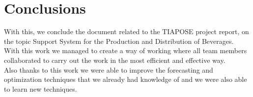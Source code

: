 \newpage

\section{Conclusions}

\quad With this, we conclude the document related to the TIAPOSE project report, on the topic Support System for the Production and Distribution of Beverages.\\

With this work we managed to create a way of working where all team members collaborated to carry out the work in the most efficient and effective way.\\

Also thanks to this work we were able to improve the forecasting and optimization techniques that we already had knowledge of and we were also able to learn new techniques.\\
